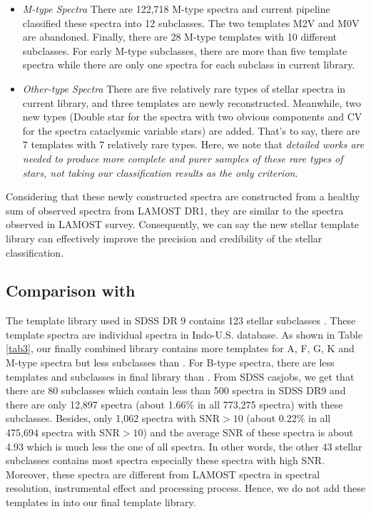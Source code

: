 \documentclass[manuscript]{aastex}
\begin{document}
\begin{itemize}
\item \emph{M-type Spectra}
There are 122,718 M-type spectra and current pipeline classified these spectra into 12 subclasses.
The two templates M2V and M0V are abandoned.
Finally, there are 28 M-type templates with 10 different subclasses.
For early M-type subclasses,
there are more than five template spectra while there are only one spectra for each subclass in current library.


\item \emph{Other-type Spectra}
There are five relatively rare types of stellar spectra in current library,
and three templates are newly reconstructed.
Meanwhile, two new types (Double star for the spectra with two obvious components and CV for the spectra cataclysmic variable stars) are added.
That's to say,
there are 7 templates with 7 relatively rare types.
Here, we note that \emph{detailed works are needed to produce more complete and purer  samples of these rare types of stars,
not taking our classification results as the only criterion}.
\end{itemize}

Considering that these newly constructed spectra are constructed from  a healthy sum of observed spectra from  LAMOST DR1,
they are  similar to the spectra observed in LAMOST survey.
Consequently, we can say the new stellar template library can effectively improve the precision  and credibility  of the stellar classification.

\subsection{Comparison with  \citet{bolton2012spectral}}

The template library used in SDSS DR 9 contains  123 stellar subclasses \citep{bolton2012spectral}.
These template spectra  are individual spectra in  Indo-U.S. database.
As shown in Table \ref{tab3},
our finally combined library contains more templates for A, F, G, K and M-type spectra
but less subclasses than \citet{bolton2012spectral}.
For B-type spectra, there are less templates and subclasses in final library than \citet{bolton2012spectral}.
From SDSS casjobs,
we get that there are 80 subclasses which contain less than 500 spectra in SDSS DR9
and  there are only 12,897 spectra (about 1.66\% in all 773,275 spectra) with these subclasses.
Besides, only 1,062 spectra  with SNR$>10$ (about 0.22\% in all 475,694 spectra with SNR$>10$) and
the average SNR of these spectra is about 4.93 which is much less the one of all spectra.
In other words, the other 43 stellar subclasses contains most spectra especially these spectra with high SNR.
Moreover, these spectra are different from LAMOST spectra in spectral resolution, instrumental effect and processing process.
Hence, we do not add these templates in  \citet{bolton2012spectral} into our final template library.
\end{document}
